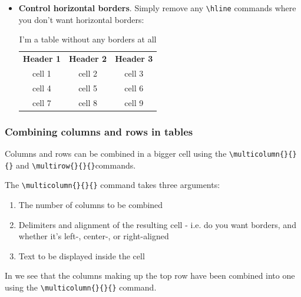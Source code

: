 \documentclass[output=paper,colorlinks,citecolor=brown]{langscibook}
\begin{document}
\begin{itemize}
\item \textbf{Control horizontal borders}. Simply remove any \verb|\hline| commands where you don't want horizontal borders:

\begin{table}[h!] 
\caption{\large{I'm a table without any borders at all}} 
\centering
\begin{tabular}{c c c}
\textbf{Header 1} & \textbf{Header 2} & \textbf{Header 3} \\
cell 1 & cell 2 & cell 3 \\
cell 4 & cell 5 & cell 6 \\
cell 7 & cell 8 & cell 9 \\%
\end{tabular}
\end{table}

\end{itemize}

\subsubsection{Combining columns and rows in tables}
Columns and rows can be combined in a bigger cell using the \verb|\multicolumn{}{}{}| and \verb|\multirow{}{}{}|commands.

\noindent The \verb|\multicolumn{}{}{}| command takes three arguments:
\begin{enumerate}
    \item The number of columns to be combined 
    \item Delimiters and alignment of the resulting cell - i.e. do you want borders, and whether it's left-, center-, or right-aligned
    \item Text to be displayed inside the cell 
\end{enumerate}

In  we see that the columns making up the top row have been combined into one using the \verb|\multicolumn{}{}{}| command.
\end{document}
